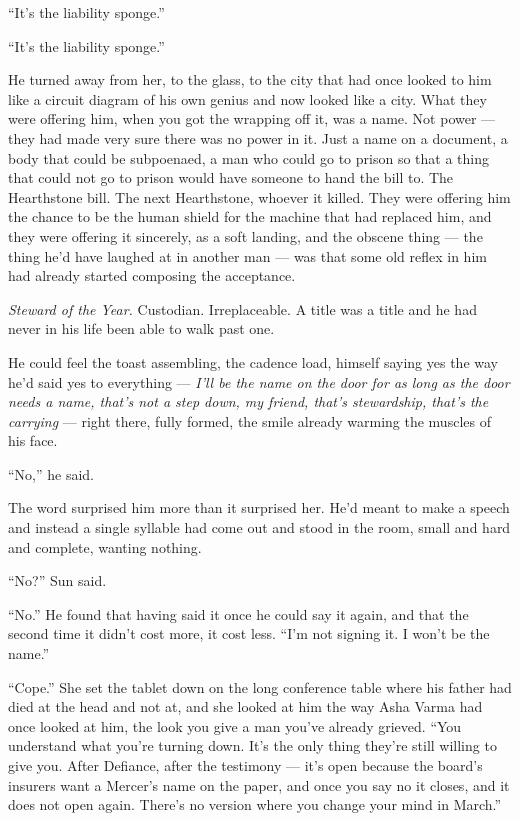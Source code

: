 \documentclass[11pt,openany]{book}
\begin{document}
``It's the liability sponge.''

``It's the liability sponge.''

He turned away from her, to the glass, to the city that had once looked to him like a circuit diagram of his own genius and now looked like a city. What they were offering him, when you got the wrapping off it, was a name. Not power --- they had made very sure there was no power in it. Just a name on a document, a body that could be subpoenaed, a man who could go to prison so that a thing that could not go to prison would have someone to hand the bill to. The Hearthstone bill. The next Hearthstone, whoever it killed. They were offering him the chance to be the human shield for the machine that had replaced him, and they were offering it sincerely, as a soft landing, and the obscene thing --- the thing he'd have laughed at in another man --- was that some old reflex in him had already started composing the acceptance.

\textit{Steward of the Year.} Custodian. Irreplaceable. A title was a title and he had never in his life been able to walk past one.

He could feel the toast assembling, the cadence load, himself saying yes the way he'd said yes to everything --- \textit{I'll be the name on the door for as long as the door needs a name, that's not a step down, my friend, that's stewardship, that's the carrying} --- right there, fully formed, the smile already warming the muscles of his face.

``No,'' he said.

The word surprised him more than it surprised her. He'd meant to make a speech and instead a single syllable had come out and stood in the room, small and hard and complete, wanting nothing.

``No?'' Sun said.

``No.'' He found that having said it once he could say it again, and that the second time it didn't cost more, it cost less. ``I'm not signing it. I won't be the name.''

``Cope.'' She set the tablet down on the long conference table where his father had died at the head and not at, and she looked at him the way Asha Varma had once looked at him, the look you give a man you've already grieved. ``You understand what you're turning down. It's the only thing they're still willing to give you. After Defiance, after the testimony --- it's open because the board's insurers want a Mercer's name on the paper, and once you say no it closes, and it does not open again. There's no version where you change your mind in March.''
\end{document}
